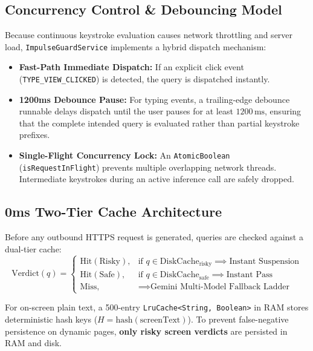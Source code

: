 \documentclass[11pt,a4paper]{article}
\begin{document}
\subsection{Concurrency Control \& Debouncing Model}
Because continuous keystroke evaluation causes network throttling and server load, \texttt{ImpulseGuardService} implements a hybrid dispatch mechanism:
\begin{itemize}
    \item \textbf{Fast-Path Immediate Dispatch:} If an explicit click event (\texttt{TYPE\_VIEW\_CLICKED}) is detected, the query is dispatched instantly.
    \item \textbf{1200ms Debounce Pause:} For typing events, a trailing-edge debounce runnable delays dispatch until the user pauses for at least $1200\,\text{ms}$, ensuring that the complete intended query is evaluated rather than partial keystroke prefixes.
    \item \textbf{Single-Flight Concurrency Lock:} An \texttt{AtomicBoolean} (\texttt{isRequestInFlight}) prevents multiple overlapping network threads. Intermediate keystrokes during an active inference call are safely dropped.
\end{itemize}

\subsection{0ms Two-Tier Cache Architecture}
Before any outbound HTTPS request is generated, queries are checked against a dual-tier cache:
\begin{equation}
\text{Verdict}(q) = 
\begin{cases} 
\text{Hit}(\text{Risky}), & \text{if } q \in \text{DiskCache}_{\text{risky}} \implies \text{Instant Suspension} \\
\text{Hit}(\text{Safe}), & \text{if } q \in \text{DiskCache}_{\text{safe}} \implies \text{Instant Pass} \\
\text{Miss}, & \implies \text{Gemini Multi-Model Fallback Ladder}
\end{cases}
\end{equation}

For on-screen plain text, a 500-entry \texttt{LruCache<String, Boolean>} in RAM stores deterministic hash keys ($H = \text{hash}(\text{screenText})$). To prevent false-negative persistence on dynamic pages, \textbf{only risky screen verdicts} are persisted in RAM and disk.
\end{document}
